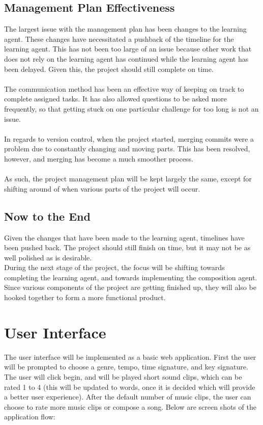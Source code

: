 \documentclass{article}
\begin{document}
\subsection{Management Plan Effectiveness}
The largest issue with the management plan has been changes to the learning agent. These changes have
necessitated a pushback of the timeline for the learning agent. This has not been too large of an issue
because other work that does not rely on the learning agent has continued while the learning agent has
been delayed. Given this, the project should still complete on time.\\
\\
The communication method has been an effective way of keeping on track to complete assigned tasks. 
It has also allowed questions to be asked more frequently, so that getting stuck on one particular 
challenge for too long is not an issue.\\
\\
In regards to version control, when the project started, merging commits were a problem due to constantly 
changing and moving parts. This has been resolved, however, and merging has become a much smoother process.\\
\\
As such, the project management plan will be kept largely the same, except for shifting around of when 
various parts of the project will occur.

\subsection{Now to the End}
Given the changes that have been made to the learning agent, timelines have been pushed back. The project
should still finish on time, but it may not be as well polished as is desirable.
\\
During the next stage of the project, the focus will be shifting towards completing the learning agent, and
towards implementing the composition agent. Since various components of the project are getting finished up,
they will also be hooked together to form a more functional product.

\section{User Interface}
The user interface will be implemented as a basic web application. First the user will be prompted 
to choose a genre, tempo, time signature, and key signature.  The user will click begin, and will 
be played short sound clips, which can be rated 1 to 4 (this will be updated to words, once it is 
decided which will provide a better user experience).  After the default number of music clips, the 
user can choose to rate more music clips or compose a song.  
Below are screen shots of the application flow:
\end{document}
